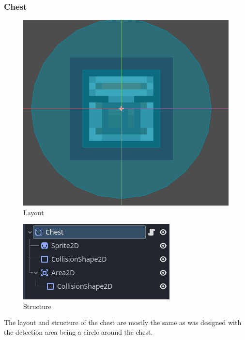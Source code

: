 \documentclass{article}
\begin{document}
        \subsubsection{Chest}
        \begin{multicols}{2}
                \begin{figure}[H]
                        \centering
                        \includegraphics[width = 0.9\columnwidth]{images/development/Chest_layout.PNG}
                        \caption{Layout}
                \end{figure}
                \begin{figure}[H]
                        \centering
                        \includegraphics[width = 0.9\columnwidth]{images/development/Chest_structure.PNG}
                        \caption{Structure}
                \end{figure}   
        \end{multicols}
        \noindent The layout and structure of the chest are mostly the same as was designed with the detection area being a circle around the chest.
\end{document}
